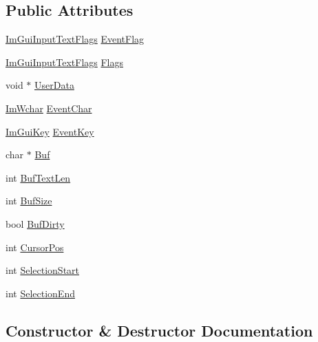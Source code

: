 \subsection*{Public Attributes}
\begin{DoxyCompactItemize}
\item 
\mbox{\hyperlink{imgui_8h_a7d2c6153a6b9b5d3178ce82434ac9fb8}{Im\+Gui\+Input\+Text\+Flags}} \mbox{\hyperlink{struct_im_gui_input_text_callback_data_a6ad2f8e385c68e56e6682fc0c4e79949}{Event\+Flag}}
\item 
\mbox{\hyperlink{imgui_8h_a7d2c6153a6b9b5d3178ce82434ac9fb8}{Im\+Gui\+Input\+Text\+Flags}} \mbox{\hyperlink{struct_im_gui_input_text_callback_data_aac3133cf2c9d194142481e54192d8fa1}{Flags}}
\item 
void $\ast$ \mbox{\hyperlink{struct_im_gui_input_text_callback_data_ae8358ea4135032204fcba6c9ada7c49f}{User\+Data}}
\item 
\mbox{\hyperlink{imgui_8h_af2c7badaf05a0008e15ef76d40875e97}{Im\+Wchar}} \mbox{\hyperlink{struct_im_gui_input_text_callback_data_a7a6e9a43c5db8f236cde912b913fe707}{Event\+Char}}
\item 
\mbox{\hyperlink{imgui_8h_a1671ca739cf1384a8cc268758f27b4e7}{Im\+Gui\+Key}} \mbox{\hyperlink{struct_im_gui_input_text_callback_data_a2db52e1da5e8109d4eeb5b0ab22200a9}{Event\+Key}}
\item 
char $\ast$ \mbox{\hyperlink{struct_im_gui_input_text_callback_data_ac8cd46c3473851c2822aae8240289069}{Buf}}
\item 
int \mbox{\hyperlink{struct_im_gui_input_text_callback_data_aa4db7629a772cfc3286a5a3fd1e5f1ab}{Buf\+Text\+Len}}
\item 
int \mbox{\hyperlink{struct_im_gui_input_text_callback_data_a0e391986e9359f6777ab27a3b08229a6}{Buf\+Size}}
\item 
bool \mbox{\hyperlink{struct_im_gui_input_text_callback_data_aa2d91cca2b46de3f2b218573579f122b}{Buf\+Dirty}}
\item 
int \mbox{\hyperlink{struct_im_gui_input_text_callback_data_a45b3cc4d7625b1bc38d5b995ca149b43}{Cursor\+Pos}}
\item 
int \mbox{\hyperlink{struct_im_gui_input_text_callback_data_a72642ac2ce877eaade95386cad70ee8a}{Selection\+Start}}
\item 
int \mbox{\hyperlink{struct_im_gui_input_text_callback_data_a616bf3a1f0c2d73b9133931f22ab44a7}{Selection\+End}}
\end{DoxyCompactItemize}


\subsection{Constructor \& Destructor Documentation}
\mbox{\label{struct_im_gui_input_text_callback_data_ae19641bad15c1a163928d121075ca09c}} 
